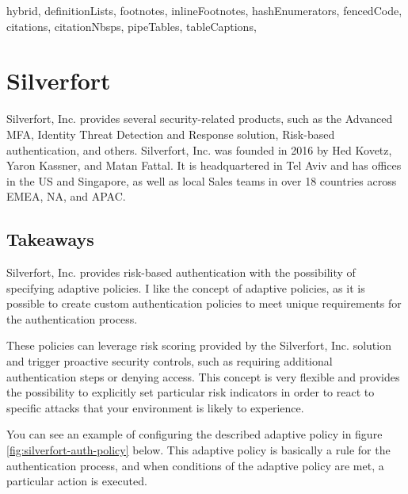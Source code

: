 \documentclass[
  digital,     %
  oneside,     %
  nosansbold,  %
  nocolorbold, %
  lof,         %
  lot,         %
]{fithesis4}
\begin{document}
\begin{markdown*}{%
  hybrid,
  definitionLists,
  footnotes,
  inlineFootnotes,
  hashEnumerators,
  fencedCode,
  citations,
  citationNbsps,
  pipeTables,
  tableCaptions,
}
\newpage
\section{Silverfort}
Silverfort, Inc. provides several security-related products, such as the Advanced MFA, Identity Threat Detection and Response solution, Risk-based authentication, and others.
Silverfort, Inc. was founded in 2016 by Hed Kovetz, Yaron Kassner, and Matan Fattal.
It is headquartered in Tel Aviv and has offices in the US and Singapore, as well as local Sales teams in over 18 countries across EMEA, NA, and APAC.\cite{example_silverfort}

\subsection{Takeaways}

Silverfort, Inc. provides risk-based authentication with the possibility of specifying adaptive policies.
I like the concept of adaptive policies, as it is possible to create custom authentication policies to meet unique requirements for the authentication process.

These policies can leverage risk scoring provided by the Silverfort, Inc. solution and trigger proactive security controls, such as requiring additional authentication steps or denying access. 
This concept is very flexible and provides the possibility to explicitly set particular risk indicators in order to react to specific attacks that your environment is likely to experience.

You can see an example of configuring the described adaptive policy in figure \ref{fig:silverfort-auth-policy} below.
This adaptive policy is basically a rule for the authentication process, and when conditions of the adaptive policy are met, a particular action is executed.\cite{example_silverfort}


\end{markdown*}
\end{document}
